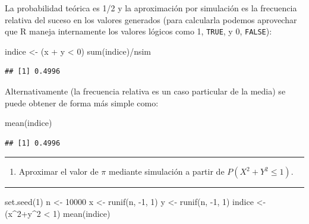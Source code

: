 \documentclass[
]{book}
\newenvironment{Shaded}{\begin{snugshade}}{\end{snugshade}}
\newcommand{\DecValTok}[1]{\textcolor[rgb]{0.00,0.00,0.81}{#1}}
\newcommand{\FunctionTok}[1]{\textcolor[rgb]{0.00,0.00,0.00}{#1}}
\newcommand{\NormalTok}[1]{#1}
\newcommand{\OtherTok}[1]{\textcolor[rgb]{0.56,0.35,0.01}{#1}}
\newcommand{\SpecialCharTok}[1]{\textcolor[rgb]{0.00,0.00,0.00}{#1}}
\providecommand{\tightlist}{%
  \setlength{\itemsep}{0pt}\setlength{\parskip}{0pt}}
\theoremstyle{break}
\theoremstyle{nonumberplain}
\begin{document}
La probabilidad teórica es 1/2 y la aproximación por simulación es la frecuencia relativa del suceso en los valores generados (para calcularla podemos aprovechar que R maneja internamente los valores lógicos como 1, \texttt{TRUE}, y 0, \texttt{FALSE}):

\begin{Shaded}
\begin{Highlighting}[]
\NormalTok{indice }\OtherTok{\textless{}{-}}\NormalTok{ (x }\SpecialCharTok{+}\NormalTok{ y }\SpecialCharTok{\textless{}} \DecValTok{0}\NormalTok{)}
\FunctionTok{sum}\NormalTok{(indice)}\SpecialCharTok{/}\NormalTok{nsim}
\end{Highlighting}
\end{Shaded}

\begin{verbatim}
## [1] 0.4996
\end{verbatim}

Alternativamente (la frecuencia relativa es un caso particular de la media) se puede obtener de forma más simple como:

\begin{Shaded}
\begin{Highlighting}[]
\FunctionTok{mean}\NormalTok{(indice)}
\end{Highlighting}
\end{Shaded}

\begin{verbatim}
## [1] 0.4996
\end{verbatim}

\begin{center}\rule{0.5\linewidth}{0.5pt}\end{center}

\begin{enumerate}
\def\labelenumi{\alph{enumi})}
\setcounter{enumi}{1}
\tightlist
\item
  Aproximar el valor de \(\pi\) mediante simulación a partir de
  \(P\left( X^2 +Y^2 \leq 1 \right)\).
\end{enumerate}

\begin{center}\rule{0.5\linewidth}{0.5pt}\end{center}

\begin{Shaded}
\begin{Highlighting}[]
\FunctionTok{set.seed}\NormalTok{(}\DecValTok{1}\NormalTok{)}
\NormalTok{n }\OtherTok{\textless{}{-}} \DecValTok{10000}
\NormalTok{x }\OtherTok{\textless{}{-}} \FunctionTok{runif}\NormalTok{(n, }\SpecialCharTok{{-}}\DecValTok{1}\NormalTok{, }\DecValTok{1}\NormalTok{)}
\NormalTok{y }\OtherTok{\textless{}{-}} \FunctionTok{runif}\NormalTok{(n, }\SpecialCharTok{{-}}\DecValTok{1}\NormalTok{, }\DecValTok{1}\NormalTok{)}
\NormalTok{indice }\OtherTok{\textless{}{-}}\NormalTok{ (x}\SpecialCharTok{\^{}}\DecValTok{2}\SpecialCharTok{+}\NormalTok{y}\SpecialCharTok{\^{}}\DecValTok{2} \SpecialCharTok{\textless{}} \DecValTok{1}\NormalTok{)}
\FunctionTok{mean}\NormalTok{(indice)}
\end{Highlighting}
\end{Shaded}
\end{document}

